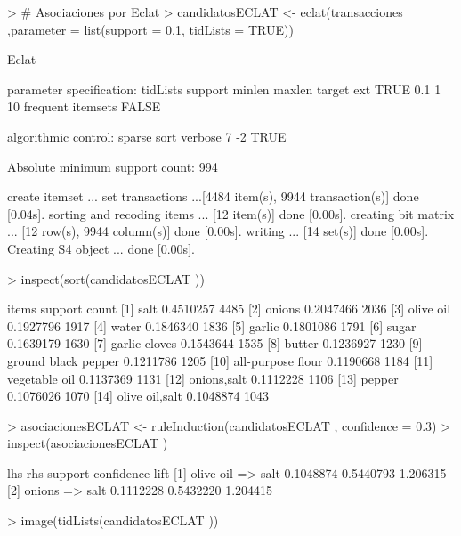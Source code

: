 \documentclass [a4paper] {article}
\begin{document}
\begin{Schunk}
\begin{Sinput}
> # Asociaciones por Eclat
> candidatosECLAT <- eclat(transacciones ,parameter = list(support = 0.1, tidLists = TRUE))
\end{Sinput}
\begin{Soutput}
Eclat

parameter specification:
 tidLists support minlen maxlen            target   ext
     TRUE     0.1      1     10 frequent itemsets FALSE

algorithmic control:
 sparse sort verbose
      7   -2    TRUE

Absolute minimum support count: 994 

create itemset ... 
set transactions ...[4484 item(s), 9944 transaction(s)] done [0.04s].
sorting and recoding items ... [12 item(s)] done [0.00s].
creating bit matrix ... [12 row(s), 9944 column(s)] done [0.00s].
writing  ... [14 set(s)] done [0.00s].
Creating S4 object  ... done [0.00s].
\end{Soutput}
\begin{Sinput}
> inspect(sort(candidatosECLAT ))
\end{Sinput}
\begin{Soutput}
     items                 support   count
[1]  {salt}                0.4510257 4485 
[2]  {onions}              0.2047466 2036 
[3]  {olive oil}           0.1927796 1917 
[4]  {water}               0.1846340 1836 
[5]  {garlic}              0.1801086 1791 
[6]  {sugar}               0.1639179 1630 
[7]  {garlic cloves}       0.1543644 1535 
[8]  {butter}              0.1236927 1230 
[9]  {ground black pepper} 0.1211786 1205 
[10] {all-purpose flour}   0.1190668 1184 
[11] {vegetable oil}       0.1137369 1131 
[12] {onions,salt}         0.1112228 1106 
[13] {pepper}              0.1076026 1070 
[14] {olive oil,salt}      0.1048874 1043 
\end{Soutput}
\begin{Sinput}
> asociacionesECLAT <- ruleInduction(candidatosECLAT , confidence = 0.3)
> inspect(asociacionesECLAT )
\end{Sinput}
\begin{Soutput}
    lhs            rhs    support   confidence lift    
[1] {olive oil} => {salt} 0.1048874 0.5440793  1.206315
[2] {onions}    => {salt} 0.1112228 0.5432220  1.204415
\end{Soutput}
\end{Schunk}
\begin{Schunk}
\begin{Sinput}
> image(tidLists(candidatosECLAT ))
\end{Sinput}
\end{Schunk}
\end{document}
